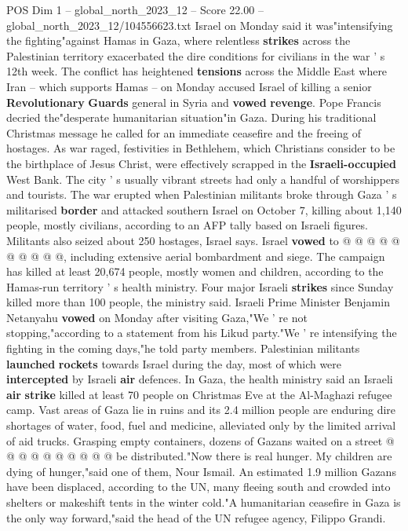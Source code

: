 \begin{textsample}{POS Dim 1 – global\_north\_2023\_12 – Score 22.00 – global\_north\_2023\_12/104556623.txt}  \label{ex:f1_pos_252}
Israel on Monday said it was"intensifying the fighting"against Hamas in Gaza, where relentless \textbf{strikes} across the Palestinian territory exacerbated the dire conditions for civilians in the war ' s 12th week.
The conflict has heightened \textbf{tensions} across the Middle East where Iran -- which supports Hamas -- on Monday accused Israel of killing a senior \textbf{Revolutionary} \textbf{Guards} general in Syria and \textbf{vowed} \textbf{revenge}.
Pope Francis decried the"desperate humanitarian situation"in Gaza.
During his traditional Christmas message he called for an immediate ceasefire and the freeing of hostages.
As war raged, festivities in Bethlehem, which Christians consider to be the birthplace of Jesus Christ, were effectively scrapped in the \textbf{Israeli-occupied} West Bank.
The city ' s usually vibrant streets had only a handful of worshippers and tourists.
The war erupted when Palestinian militants broke through Gaza ' s militarised \textbf{border} and attacked southern Israel on October 7, killing about 1,140 people, mostly civilians, according to an AFP tally based on Israeli figures.
Militants also seized about 250 hostages, Israel says.
Israel \textbf{vowed} to @ @ @ @ @ @ @ @ @ @, including extensive aerial bombardment and siege.
The campaign has killed at least 20,674 people, mostly women and children, according to the Hamas-run territory ' s health ministry.
Four major Israeli \textbf{strikes} since Sunday killed more than 100 people, the ministry said.
Israeli Prime Minister Benjamin Netanyahu \textbf{vowed} on Monday after visiting Gaza,"We ' re not stopping,"according to a statement from his Likud party."We ' re intensifying the fighting in the coming days,"he told party members.
Palestinian militants \textbf{launched} \textbf{rockets} towards Israel during the day, most of which were \textbf{intercepted} by Israeli \textbf{air} defences.
In Gaza, the health ministry said an Israeli \textbf{air} \textbf{strike} killed at least 70 people on Christmas Eve at the Al-Maghazi refugee camp.
Vast areas of Gaza lie in ruins and its 2.4 million people are enduring dire shortages of water, food, fuel and medicine, alleviated only by the limited arrival of aid trucks.
Grasping empty containers, dozens of Gazans waited on a street @ @ @ @ @ @ @ @ @ @ be distributed."Now there is real hunger.
My children are dying of hunger,"said one of them, Nour Ismail.
An estimated 1.9 million Gazans have been displaced, according to the UN, many fleeing south and crowded into shelters or makeshift tents in the winter cold."A humanitarian ceasefire in Gaza is the only way forward,"said the head of the UN refugee agency, Filippo Grandi.

\end{textsample}

